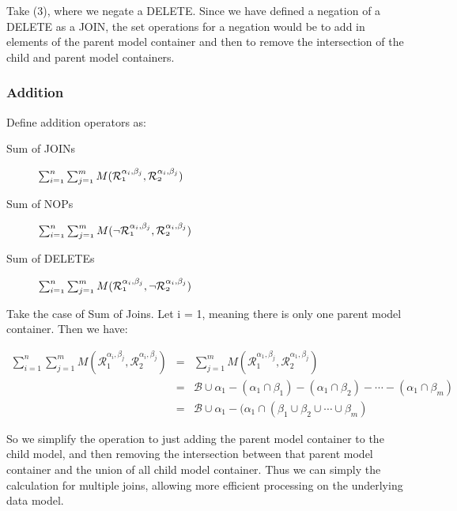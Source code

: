\documentclass[12pt]{amsart}
\begin{document}
Take (3), where we negate a DELETE. Since we have defined a negation of a DELETE as a JOIN, the set operations for a negation would be to add in elements of the parent model container and then to remove the intersection of the child and parent model containers.
\subsubsection{Addition}
Define addition operators as:
\begin{description}
\item[Sum of JOINs] $\mathnormal{\sum_{i=1}^n \sum_{j=1}^m M(\mathcal{R}^{\alpha_{i} , \beta_{j}}_{1},\mathcal{R}^{\alpha_{i} , \beta_{j}}_{2} ) }$
\item[Sum of NOPs] $\mathnormal{\sum_{i=1}^n \sum_{j=1}^m M(\neg \mathcal{R}^{\alpha_{i} , \beta_{j}}_{1},\mathcal{R}^{\alpha_{i} , \beta_{j}}_{2} ) }$
\item[Sum  of DELETEs] $\mathnormal{\sum_{i=1}^n \sum_{j=1}^m M(\mathcal{R}^{\alpha_{i} , \beta_{j}}_{1},\neg \mathcal{R}^{\alpha_{i} , \beta_{j}}_{2} ) }$
\end{description}

Take the case of Sum of Joins. Let i = 1, meaning there is only one parent model container. Then we have:

\begin{eqnarray}
\sum_{i=1}^n \sum_{j=1}^m M(\mathcal{R}^{\alpha_{i} , \beta_{j}}_{1},\mathcal{R}^{\alpha_{i} , \beta_{j}}_{2} )  & = &
\sum_{j=1}^m M(\mathcal{R}^{\alpha_{1} , \beta_{j}}_{1},\mathcal{R}^{\alpha_{1} , \beta_{j}}_{2} ) \\
& = &
\mathcal{B} \cup \alpha_{1}-(\alpha_{1} \cap \beta_{1}) - (\alpha_{1} \cap \beta_{2})  - \cdots - (\alpha_{1} \cap \beta_{m})  \\ & = &
\mathcal{B} \cup \alpha_{1}-(\alpha_{1} \cap (\beta_{1} \cup \beta_{2}  \cup \cdots  \cup \beta_{m})
\end{eqnarray}

So we simplify the operation to just adding the parent model container to the child model, and then removing the intersection between that parent model container and the union of all child model container. Thus we can simply the calculation for multiple joins, allowing more efficient processing on the underlying data model.

\appendix
\end{document}
